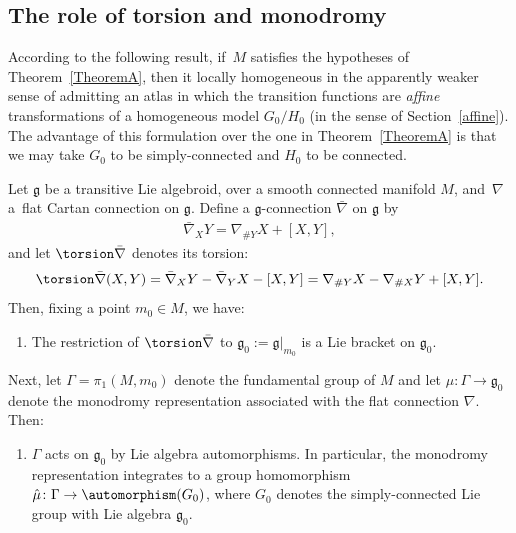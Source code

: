 \subsection{The role of torsion and monodromy}\label{rolltorsion}
According to the following result, if~$M$ satisf\/ies the hypotheses of
Theorem~\ref{TheoremA}, then it locally homogeneous in the apparently weaker sense
of admitting an atlas in which the transition functions are {\em
  affine} transformations of a homogeneous model $G_0/H_0$ (in the
sense of Section~\ref{affine}). The advantage of this formulation over the one
in Theorem~\ref{TheoremA} is that we may take $G_0$ to be simply-connected and
$H_0$ to be connected.

\begin{PropositionBlaom}\label{Proposition5.1}
  Let $\mathfrak g$ be a transitive Lie algebroid, over a smooth
  connected manifold $M$, and~$\nabla $ a~flat Cartan connection on
  $\mathfrak g$. Define a ${\mathfrak g}$-connection $\bar\nabla$ on
  $\mathfrak g$ by
  \begin{gather*}
    \bar\nabla_XY=\nabla_{\#Y}X+[X,Y],
  \end{gather*}
  and let $\torsion \bar\nabla $ denotes its torsion:
  \begin{gather*}
    \torsion \bar\nabla (X,Y)=\bar\nabla_XY-\bar\nabla_YX-[X,Y]=\nabla_{\#Y}X-\nabla_{\#X}Y+[X,Y].
  \end{gather*}
  Then, fixing a point $m_0 \in M$, we have:
  \begin{enumerate}\itemsep=0pt
  \item[$(1)$]  %
  The restriction of $\torsion \bar\nabla$ to ${\mathfrak
      g}_0:={\mathfrak g}|_{m_0}$ is a Lie bracket on ${\mathfrak
      g}_0$.
  \end{enumerate}

  Next, let $\Gamma=\pi_1(M,m_0)$ denote the fundamental group of $M$
  and let $\mu \colon \Gamma \rightarrow {\mathfrak g}_0$ denote the
  monodromy representation associated with the flat connection
  $\nabla$. Then:
  \begin{enumerate}\itemsep=0pt
  \item[$(2)$] %
  $\Gamma$ acts on ${\mathfrak g}_0$ by Lie algebra
    automorphisms. In particular, the monodromy representation
    integrates to a group homomorphism $\hat\mu \colon \Gamma
    \rightarrow \automorphism(G_0)$, where $G_0$ denotes the
    simply-connected Lie group with Lie algebra ${\mathfrak g}_0 $.
  \end{enumerate}


\end{PropositionBlaom}
